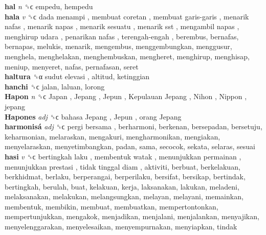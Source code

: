 \textbf{hal} \emph{n}  ␝ϲ  empedu, hempedu  \\
\textbf{hala} \emph{v}  ␝ϲ   dada menampi ,  membuat coretan ,  membuat garis-garis ,  menarik nafas ,  menarik napas ,  menarik sesuatu ,  menarik sst ,  mengambil napas ,  menghirup udara ,  penarikan nafas ,  terengah-engah , berembus, bernafas, bernapas, melukis, menarik, mengembus, menggembungkan, menggusur, menghela, menghelakan, menghembuskan, mengheret, menghirup, menghisap, meniup, menyeret, nafas, pernafasan, seret  \\
\textbf{haltura} ␝α   sudut elevasi , altitud, ketinggian  \\
\textbf{hanchi} ␝ϲ  jalan, laluan, lorong  \\
\textbf{Hapon} \emph{n}  ␝ϲ   Japan ,  Jepang ,  Jepun ,  Kepulauan Jepang ,  Nihon ,  Nippon , jepang  \\
\textbf{Hapones} \emph{adj}  ␝ϲ   bahasa Jepang ,  Jepun ,  orang Jepang   \\
\textbf{harmonisá} \emph{adj}  ␝ϲ   pergi bersama , berharmoni, berkenan, bersepadan, bersetuju, keharmonian, melaraskan, mengakuri, mengharmonikan, mengiakan, menyelaraskan, menyetimbangkan, padan, sama, secocok, sekata, selaras, sesuai  \\
\textbf{hasi} \emph{v}  ␝ϲ   bertingkah laku ,  membentuk watak ,  menunjukkan permainan ,  menunjukkan prestasi ,  tidak tinggal diam , aktiviti, berbuat, berkelakuan, berkhidmat, berlaku, berperangai, berperilaku, bersifat, bersikap, bertindak, bertingkah, berulah, buat, kelakuan, kerja, laksanakan, lakukan, meladeni, melaksanakan, melakukan, melangsungkan, melayan, melayani, memainkan, membentuk, membikin, membuat, membuatkan, mempertontonkan, mempertunjukkan, mengakok, menjadikan, menjalani, menjalankan, menyajikan, menyelenggarakan, menyelesaikan, menyempurnakan, menyiapkan, tindak  \\
